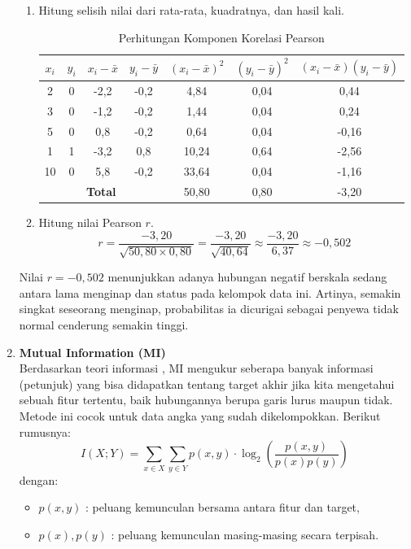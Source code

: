\begin{enumerate}
\begin{enumerate}
        \item Hitung selisih nilai dari rata-rata, kuadratnya, dan hasil kali.
        \begin{table}[H]
        \centering
        \caption{Perhitungan Komponen Korelasi Pearson}
        \begin{tabular}{|c|c|c|c|c|c|c|}
        \hline
        $x_i$ & $y_i$ & $x_i - \bar{x}$ & $y_i - \bar{y}$ & $(x_i - \bar{x})^2$ & $(y_i - \bar{y})^2$ & $(x_i - \bar{x})(y_i - \bar{y})$ \\
        \hline
        2 & 0 & -2{,}2 & -0{,}2 & 4{,}84 & 0{,}04 & 0{,}44 \\
        3 & 0 & -1{,}2 & -0{,}2 & 1{,}44 & 0{,}04 & 0{,}24 \\
        5 & 0 & 0{,}8 & -0{,}2 & 0{,}64 & 0{,}04 & -0{,}16 \\
        1 & 1 & -3{,}2 & 0{,}8 & 10{,}24 & 0{,}64 & -2{,}56 \\
        10 & 0 & 5{,}8 & -0{,}2 & 33{,}64 & 0{,}04 & -1{,}16 \\
        \hline
        \multicolumn{4}{|c|}{\textbf{Total}} & 50{,}80 & 0{,}80 & -3{,}20 \\
        \hline
        \end{tabular}
        \end{table}
    
        \item Hitung nilai Pearson $r$.
        $$
        r = \frac{-3{,}20}{\sqrt{50{,}80 \times 0{,}80}} = \frac{-3{,}20}{\sqrt{40{,}64}} \approx \frac{-3{,}20}{6{,}37} \approx -0{,}502
        $$
    \end{enumerate}
    
    Nilai $r = -0{,}502$ menunjukkan adanya hubungan negatif berskala sedang antara lama menginap dan status pada kelompok data ini. Artinya, semakin singkat seseorang menginap, probabilitas ia dicurigai sebagai penyewa tidak normal cenderung semakin tinggi.
    
    \item \textbf{Mutual Information (MI)} \\
    Berdasarkan teori informasi \cite{cover2006elements}, MI mengukur seberapa banyak informasi (petunjuk) yang bisa didapatkan tentang target akhir jika kita mengetahui sebuah fitur tertentu, baik hubungannya berupa garis lurus maupun tidak. Metode ini cocok untuk data angka yang sudah dikelompokkan. Berikut rumusnya:
    $$
    I(X;Y) = \sum_{x \in X} \sum_{y \in Y} p(x,y) \cdot \log_2 \left( \frac{p(x,y)}{p(x)p(y)} \right)
    $$
    dengan:
    \begin{itemize}
        \item $p(x,y)$ : peluang kemunculan bersama antara fitur dan target,
        \item $p(x), p(y)$ : peluang kemunculan masing-masing secara terpisah.
    \end{itemize}
    

\end{enumerate}
